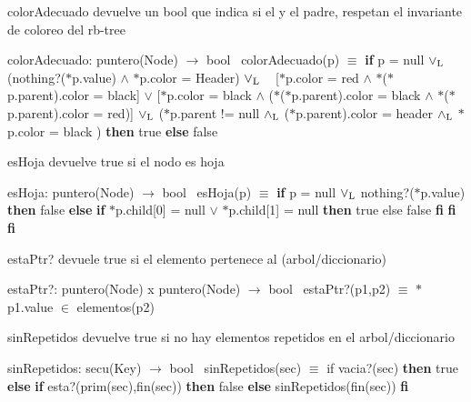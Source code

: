 \begin{DoxyParagraph}{color\+Adecuado}
devuelve un bool que indica si el y el padre, respetan el invariante de coloreo del rb-\/tree

color\+Adecuado\+: puntero(\+Node) $\to$ bool~\newline
 color\+Adecuado(p) $\equiv$ {\bfseries if} p = null $\lor_{\rm L}$ (nothing?($\ast$p.value) $\land$ $\ast$p.color = Header) $\lor_{\rm L}$ ~\newline
 \mbox{[}$\ast$p.color = red $\land$ $\ast$($\ast$p.parent).color = black\mbox{]} $\lor$ \mbox{[}$\ast$p.color = black $\land$ ($\ast$($\ast$p.parent).color = black $\land$ $\ast$($\ast$p.parent).color = red)\mbox{]} $\lor_{\rm L}$ ($\ast$p.parent != null $\land_{\rm L}$ ($\ast$p.parent).color = header $\land_{\rm L}$ $\ast$p.color = black ) {\bfseries then} true {\bfseries else} false 
\end{DoxyParagraph}


\begin{DoxyParagraph}{es\+Hoja}
devuelve true si el nodo es hoja

es\+Hoja\+: puntero(\+Node) $\to$ bool~\newline
 es\+Hoja(p) $\equiv$ {\bfseries if} p = null $\lor_{\rm L}$ nothing?($\ast$p.value) {\bfseries then} false {\bfseries else} {\bfseries if} $\ast$p.child\mbox{[}0\mbox{]} = null $\lor$ $\ast$p.child\mbox{[}1\mbox{]} = null {\bfseries then} true else false {\bfseries fi} {\bfseries fi} {\bfseries fi} 
\end{DoxyParagraph}


\begin{DoxyParagraph}{esta\+Ptr?}
devuele true si el elemento pertenece al (arbol/diccionario)

esta\+Ptr?\+: puntero(\+Node) x puntero(\+Node) $\to$ bool~\newline
 esta\+Ptr?(p1,p2) $\equiv$ $\ast$p1.value $\in$ elementos(p2) 
\end{DoxyParagraph}


\begin{DoxyParagraph}{sin\+Repetidos}
devuelve true si no hay elementos repetidos en el arbol/diccionario

sin\+Repetidos\+: secu(\+Key) $\to$ bool~\newline
 sin\+Repetidos(sec) $\equiv$ if vacia?(sec) {\bfseries then} true {\bfseries else} {\bfseries if} esta?(prim(sec),fin(sec)) {\bfseries then} false {\bfseries else} sin\+Repetidos(fin(sec)) {\bfseries fi} 
\end{DoxyParagraph}



